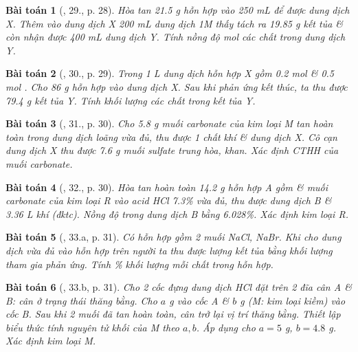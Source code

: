 \documentclass{article}
\newtheorem{baitoan}{Bài toán}
\begin{document}
\begin{baitoan}[\cite{An_350_BT_Hoa_Hoc_9}, 29., p. 28]
	Hòa tan \emph{21.5 g} hỗn hợp \emph{} vào \emph{250 mL } để được dung dịch X. Thêm vào dung dịch X \emph{200 mL} dung dịch \emph{ 1M} thấy tách ra \emph{19.85 g} kết tủa \& còn nhận được \emph{400 mL} dung dịch Y. Tính nồng độ mol các chất trong dung dịch Y.
\end{baitoan}

\begin{baitoan}[\cite{An_350_BT_Hoa_Hoc_9}, 30., p. 29]
	Trong \emph{1 L} dung dịch hỗn hợp X gồm \emph{0.2 mol } \& \emph{0.5 mol }. Cho \emph{86 g} hỗn hợp \emph{} vào dung dịch X. Sau khi phản ứng kết thúc, ta thu được \emph{79.4 g} kết tủa Y. Tính khối lượng các chất trong kết tủa Y.
\end{baitoan}

\begin{baitoan}[\cite{An_350_BT_Hoa_Hoc_9}, 31., p. 30]
	Cho \emph{5.8 g} muối carbonate \emph{} của kim loại M tan hoàn toàn trong dung dịch \emph{} loãng vừa đủ, thu được 1 chất khí \& dung dịch X. Cô cạn dung dịch X thu được \emph{7.6 g} muối sulfate trung hòa, khan. Xác định CTHH của muối carbonate.
\end{baitoan}

\begin{baitoan}[\cite{An_350_BT_Hoa_Hoc_9}, 32., p. 30]
	Hòa tan hoàn toàn \emph{14.2 g} hỗn hợp A gồm \emph{} \& muối carbonate của kim loại R vào acid \emph{HCl 7.3\%} vừa đủ, thu được dung dịch B \& \emph{3.36 L} khí \emph{} (đktc). Nồng độ \emph{} trong dung dịch B bằng \emph{6.028\%}. Xác định kim loại R.
\end{baitoan}

\begin{baitoan}[\cite{An_350_BT_Hoa_Hoc_9}, 33.a, p. 31]
	Có hỗn hợp gồm 2 muối \emph{NaCl, NaBr}. Khi cho dung dịch \emph{} vừa đủ vào hỗn hợp trên người ta thu được lượng kết tủa bằng khối lượng \emph{} tham gia phản ứng. Tính \% khối lượng mỗi chất trong hỗn hợp.
\end{baitoan}

\begin{baitoan}[\cite{An_350_BT_Hoa_Hoc_9}, 33.b, p. 31]
	Cho 2 cốc đựng dung dịch \emph{HCl} đặt trên 2 đĩa cân A \& B: cân ở trạng thái thăng bằng. Cho $a$ \emph{g } vào cốc A \& $b$ \emph{g } (M: kim loại kiềm) vào cốc B. Sau khi 2 muối đã tan hoàn toàn, cân trở lại vị trí thăng bằng. Thiết lập biểu thức tính nguyên tử khối của M theo $a,b$. Áp dụng cho $a = 5$ \emph{g}, $b = 4.8$ \emph{g}. Xác định kim loại M.
\end{baitoan}
\end{document}

